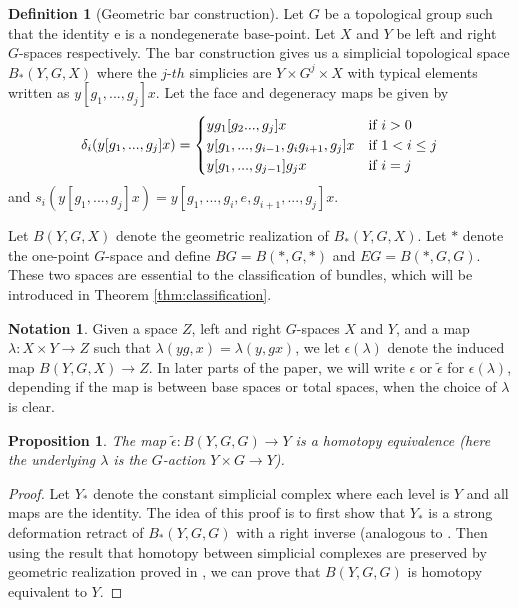\documentclass[psamsfonts]{amsart}
\newtheorem{prop}[thm]{Proposition}
\theoremstyle{definition}
\newtheorem{defn}[thm]{Definition}
\newtheorem{notn}[thm]{Notation}
\theoremstyle{remark}
\numberwithin{equation}{section}
\begin{document}
\begin{defn}[Geometric bar construction]
Let $G$ be a topological group such that the identity e is a nondegenerate base-point. Let $X$ and $Y$ be left and right $G$-spaces respectively. The bar construction gives us a simplicial topological space $B_{*}(Y, G, X)$ where the $j$-$th$ simplicies are $Y \times G^{j} \times X$ with typical elements written as $y[g_{1}, ..., g_{j}]x$. Let the face and degeneracy maps be given by
\begin{displaymath}
\delta_{i}(y[g_{1}, ..., g_{j}]x) = \begin{cases}
yg_{1}[g_{2} ..., g_{j}]x & \text{if $ i > 0$}\\
y[g_{1}, ..., g_{i - 1}, g_{i}g_{i + 1}, g_{j}]x & \text{if $ 1 < i \leq j$}\\
y[g_{1}, ..., g_{j - 1}]g_{j}x & \text{if $ i = j$}\\
\end{cases}
\end{displaymath}
and $s_{i}(y[g_{1}, ..., g_{j}]x) = y[g_{1}, ..., g_{i}, e, g_{i + 1}, ..., g_{j}]x$.
\end{defn}

Let $B(Y, G, X)$ denote the geometric realization of $B_{*}(Y, G, X)$. Let $*$ denote the one-point $G$-space and define $BG = B(*, G, *)$ and $EG = B(*, G, G)$. These two spaces are essential to the classification of bundles, which will be introduced in Theorem \ref{thm:classification}.

\begin{notn}
\label{notn:epsilon}
Given a space $Z$, left and right $G$-spaces $X$ and $Y$, and a map $\lambda: X \times Y \to Z$ such that $\lambda(yg, x) = \lambda(y, gx)$, we let $\epsilon(\lambda)$ denote the induced map $B(Y, G, X) \to Z$. In later parts of the paper, we will write $\epsilon$ or $\tilde{\epsilon}$ for $\epsilon(\lambda)$, depending if the map is between base spaces or total spaces, when the choice of $\lambda$ is clear.	
\end{notn}


\begin{prop}
\label{prop:extraDeneracy}
The map $\tilde{\epsilon}: B(Y, G, G) \rightarrow Y$ is a homotopy equivalence (here the underlying $\lambda$ is the $G$-action $Y \times G \to Y$).
\end{prop}
\begin{proof}

Let $Y_{*}$ denote the constant simplicial complex where each level is $Y$ and all maps are the identity. The idea of this proof is to first show that $Y_{*}$ is a strong deformation retract of $B_{*}(Y, G, G)$ with a right inverse (analogous to \cite[Proposition 9.8]{Iterated}. Then using the result that homotopy between simplicial complexes are preserved by geometric realization proved in \cite[Corollary 11.1]{Iterated}, we can prove that $B(Y, G, G)$ is homotopy equivalent to $Y$. 
\end{proof}
\end{document}
